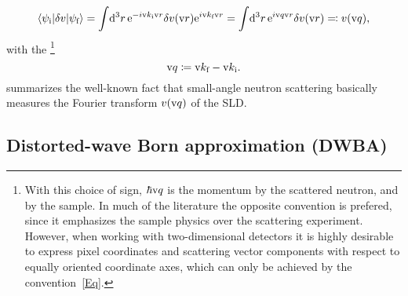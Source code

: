 \begin{equation}\label{Echiq}
  \left\langle \psi_{\text{i}}|\delta v|\psi_{\text{f}}\right\rangle
  = \int\!\mathrm d^3r\, {\rm e}^{-i\text{v}{k}_{\text{i}}\text{v}{r}}\delta v(\text{v}{r}){\rm e}^{i\text{v}{k}_{\text{f}}\text{v}{r}}
  = \int\!\mathrm d^3r\, {\rm e}^{i\text{v}{q}\text{v}{r}}\delta v(\text{v}{r})
  \eqqcolon v(\text{v}{q}),
\end{equation}
%
with the \footnote
{With this choice of sign,
%
$\hbar\text{v}{q}$ is the momentum
%
 by the scattered neutron,
and  by the sample.
In much of the literature the opposite convention is prefered,
since it emphasizes the sample physics over the scattering experiment.
However, when working with two-dimensional detectors
it is highly desirable to express pixel coordinates
and scattering vector components
with respect to equally oriented coordinate axes,
which can only be achieved by the convention~\cref{Eq}.}
%
\begin{equation}\label{Eq}
  \text{v}{q}\coloneqq \text{v}{k}_{\text{f}}-\text{v}{k}_{\text{i}}.
\end{equation}
%
 summarizes the well-known fact that
small-angle neutron scattering basically measures
the Fourier transform $v(\text{v}{q})$ of the SLD.
%
%

%

\subsection{Distorted-wave Born approximation (DWBA)}\label{SDWBA}

%
%

